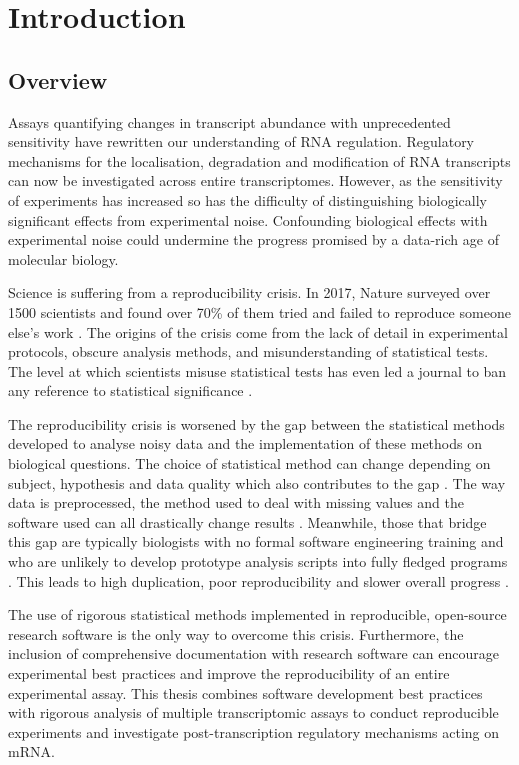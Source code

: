 \documentclass[../main.tex]{subfiles}
\begin{document}
\chapter{{Introduction}}
\onehalfspacing

\section{Overview}

Assays quantifying changes in transcript abundance with unprecedented sensitivity have rewritten our understanding of RNA regulation.
Regulatory mechanisms for the localisation, degradation and modification of RNA transcripts can now be investigated across entire transcriptomes.
However, as the sensitivity of experiments has increased so has the difficulty of distinguishing biologically significant effects from experimental noise.
Confounding biological effects with experimental noise could undermine the progress promised by a data-rich age of molecular biology.

Science is suffering from a reproducibility crisis. 
In 2017, Nature surveyed over 1500 scientists and found over 70\% of them tried and failed to reproduce someone else's work \parencite{Baker2016}.
The origins of the crisis come from the lack of detail in experimental protocols, obscure analysis methods, and misunderstanding of statistical tests.
The level at which scientists misuse statistical tests has even led a journal to ban any reference to statistical significance \parencite{Trafimow2015}.

The reproducibility crisis is worsened by the gap between the statistical methods developed to analyse noisy data and the implementation of these methods on biological questions.
The choice of statistical method can change depending on subject, hypothesis and data quality which also contributes to the gap \parencite{Ching2018}.
The way data is preprocessed, the method used to deal with missing values and the software used can all drastically change results \parencite{Ioannidis2009}.
Meanwhile, those that bridge this gap are typically biologists with no formal software engineering training \parencite{Attwood2019} and who are unlikely to develop prototype analysis scripts into fully fledged programs \parencite{Prins2015}. 
This leads to high duplication, poor reproducibility and slower overall progress \parencite{Lawlor2015}.

The use of rigorous statistical methods implemented in reproducible, open-source research software is the only way to overcome this crisis.
Furthermore, the inclusion of comprehensive documentation with research software can encourage experimental best practices and improve the reproducibility of an entire experimental assay.
This thesis combines software development best practices with rigorous analysis of multiple transcriptomic assays to conduct reproducible experiments and investigate post-transcription regulatory mechanisms acting on mRNA. 
\end{document}
